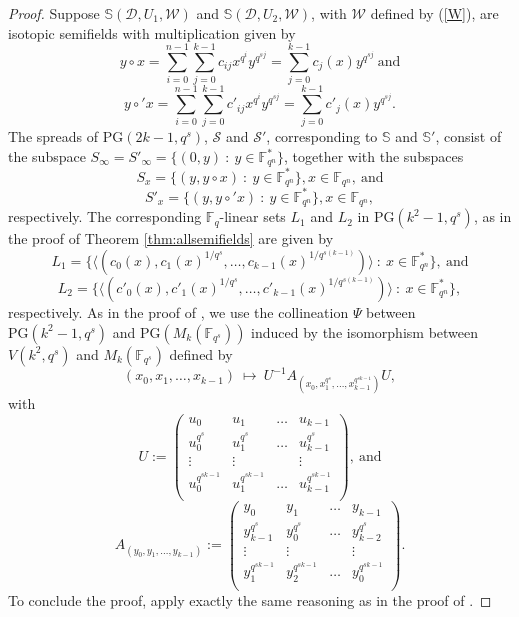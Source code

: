 \documentclass[12pt]{amsart}
\def\F{\mathbb{F}}
\def\PG{\mathrm{PG}}
\def\S{\mathbb{S}}
\def\W{\mathcal{W}}
\def\D{\mathcal{D}}
\begin{document}
\begin{proof}
Suppose $\S(\D,U_1,\W)$ and $\S(\D,U_2,\W)$, with $\W$ defined by (\ref{W}), are isotopic semifields with multiplication given by 
$$y\circ x =\sum_{i = 0}^{n-1} \sum_{j = 0}^{k-1}c_{ij}x^{q^i}y^{q^{sj}}
= \sum_{j = 0}^{k-1}c_j(x)y^{q^{sj}} ~\mbox{and}$$
$$y\circ' x =\sum_{i = 0}^{n-1} \sum_{j = 0}^{k-1}c'_{ij}x^{q^i}y^{q^{sj}}
= \sum_{j = 0}^{k-1}c'_j(x)y^{q^{sj}}.$$
The spreads of $\PG(2k-1,q^s)$, $\mathcal S$ and $\mathcal S'$, corresponding to $\S$ and $\S'$, consist of the subspace $S_\infty=S'_\infty=\{(0,y)~:~ y \in \F_{q^n}^*\}$, together with the subspaces
$$
S_x=\{(y,y\circ x)~:~y \in \F_{q^n}^*\}, x \in \F_{q^n}, ~\mbox{and}
$$
$$
S'_x=\{(y,y\circ' x)~:~y \in \F_{q^n}^*\}, x \in \F_{q^n},
$$
respectively.
The corresponding $\F_q$-linear sets $L_1$ and $L_2$ in $\PG(k^2-1,q^s)$, as in the proof of Theorem \ref{thm:allsemifields}
are given by
$$
L_1=\{\langle(c_0(x),c_1(x)^{1/q^s},\ldots,c_{k-1}(x)^{1/q^{s(k-1)}})\rangle ~:~x\in \F_{q^n}^*\}, ~\mbox{and}
$$
$$
L_2=\{\langle(c'_0(x),c'_1(x)^{1/q^s},\ldots,c'_{k-1}(x)^{1/q^{s(k-1)}})\rangle ~:~x\in \F_{q^n}^*\},
$$
respectively.
 As in the proof of \cite[Theorem 17]{Lavrauw2008}, we use the collineation $\Psi$ between $\PG(k^2-1,q^s)$ and $\PG(M_k(\F_{q^s}))$ induced by the isomorphism between $V(k^2,q^s)$ and $M_k(\F_{q^s})$ defined by
$$
(x_0,x_1,\ldots,x_{k-1}) ~\mapsto ~U^{-1}A_{(x_0,x_1^{q^s},\ldots,x_{k-1}^{q^{sk-1}})} U,
$$
with
\begin{displaymath}
U:=\left (
\begin{array}{llll}
u_0 & u_1 & \ldots & u_{k-1}\\
u_0^{q^s} & u_1^{q^s} & \ldots & u_{k-1}^{q^s}\\
\vdots & \vdots & & \vdots \\
u_0^{q^{sk-1}} & u_1^{q^{sk-1}}&  \ldots & u_{k-1}^{q^{sk-1}}\\
\end{array}
\right ), ~\mbox{and}
\end{displaymath}
\begin{displaymath}
A_{(y_0,y_1,\ldots,y_{k-1})}:=\left (
\begin{array}{llll}
y_0 & y_1 & \ldots & y_{k-1}\\
y_{k-1}^{q^s} & y_0^{q^s}& \ldots &y_{k-2}^{q^s}\\
\vdots & \vdots & & \vdots \\
y_1^{q^{sk-1}} & y_2^{q^{sk-1}} &\ldots &y_0^{q^{sk-1}}\\
\end{array}
\right ).
\end{displaymath}
To conclude the proof, apply exactly the same reasoning as in the proof of \cite[Theorem 17]{Lavrauw2008}.
\end{proof}
\end{document}
